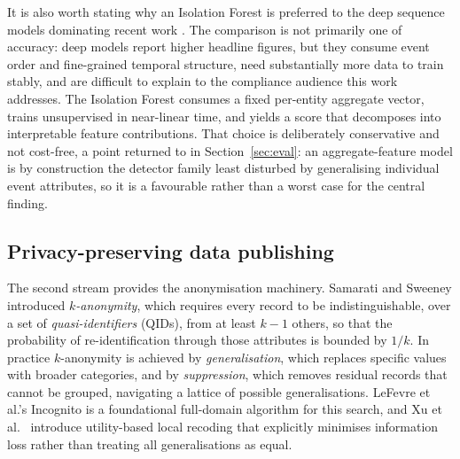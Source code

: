 \documentclass[10pt,a4paper]{article}
\newcounter{algo}
\begin{document}
It is also worth stating why an Isolation Forest is preferred to the deep sequence models dominating recent work \cite{tuor2017,yuan2021}. The comparison is not primarily one of accuracy: deep models report higher headline figures, but they consume event order and fine-grained temporal structure, need substantially more data to train stably, and are difficult to explain to the compliance audience this work addresses. The Isolation Forest consumes a fixed per-entity aggregate vector, trains unsupervised in near-linear time, and yields a score that decomposes into interpretable feature contributions. That choice is deliberately conservative and not cost-free, a point returned to in Section~\ref{sec:eval}: an aggregate-feature model is by construction the detector family least disturbed by generalising individual event attributes, so it is a favourable rather than a worst case for the central finding.

\subsection{Privacy-preserving data publishing}
The second stream provides the anonymisation machinery. Samarati \cite{samarati2001} and Sweeney \cite{sweeney2002} introduced \emph{$k$-anonymity}, which requires every record to be indistinguishable, over a set of \emph{quasi-identifiers} (QIDs), from at least $k-1$ others, so that the probability of re-identification through those attributes is bounded by $1/k$. In practice $k$-anonymity is achieved by \emph{generalisation}, which replaces specific values with broader categories, and by \emph{suppression}, which removes residual records that cannot be grouped, navigating a lattice of possible generalisations. LeFevre et al.'s Incognito \cite{lefevre2005} is a foundational full-domain algorithm for this search, and Xu et al.\ \cite{xu2006} introduce utility-based local recoding that explicitly minimises information loss rather than treating all generalisations as equal.
\end{document}
